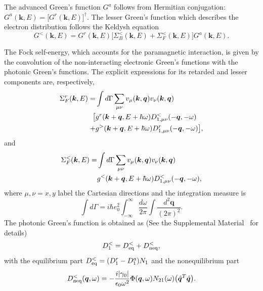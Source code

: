 \documentclass[aps,prl,twocolumn,longbibliography]{revtex4-2}
\begin{document}
The advanced Green's function $G^a$ follows from Hermitian conjugation:
$G^a(\bm{k},E) = \big[G^r(\bm{k},E)\big]^\dag$.
The lesser Green's function which describes the electron distribution follows the Keldysh
equation
\begin{equation} \label{G<}
  G^<(\bm{k},E) = G^r(\bm{k},E) \big[ \Sigma_B^<(\bm{k},E) + \Sigma_F^<(\bm{k},E) \big]
  G^a(\bm{k},E) .
\end{equation}







The Fock self-energy, which accounts for the paramagnetic interaction, is given by the
convolution of the non-interacting electronic Green's functions with the photonic Green's
functions. The explicit expressions for its retarded and lesser components are,
respectively,
\begin{align}
  \Sigma^r_F(\bm{k},E) = & \int d\Gamma \sum_{\mu\nu} v_\mu(\bm{k},\bm{q})
  v_\nu(\bm{k},\bm{q}) \notag \\
  \big[ & g^r(\bm{k}+\bm{q},E+\hbar\omega) D_{1, \mu\nu}^<(-\bm{q},-\omega)  \notag \\
  + & g^>(\bm{k}+\bm{q},E+\hbar\omega) D_{1, \mu\nu}^r(-\bm{q},-\omega) \big]
  \label{Sigma_r} ,
\end{align}
and
\begin{align}
  \Sigma^<_F(\bm{k},E) = & \int d\Gamma \sum_{\mu\nu} v_\mu(\bm{k},\bm{q})
  v_\nu(\bm{k},\bm{q}) \notag \\
  & g^<(\bm{k}+\bm{q},E+\hbar\omega) D_{1, \mu\nu}^<(-\bm{q},-\omega) ,
\end{align}
where $\mu,\nu =x,y$ label the Cartesian directions and the integration measure is
\begin{equation}
  \int d\Gamma = i\hbar e_0^2 \int_{-\infty}^\infty \frac{d\omega}{2\pi} \int
  \frac{d^2\bm{q}}{(2\pi)^2} .
\end{equation}
The photonic Green's function is obtained as (See the Supplemental Material~\cite{SM} for
details)
\begin{equation} \label{D1<_near}
  D_1^< = D_{\rm eq}^< + D_{\rm neq}^< ,
\end{equation}
with the equilibrium part $D_{\rm eq}^< = (D_1^r - D_1^a) N_1$ and the nonequilibrium
part
\begin{equation}
  D_{\rm neq}^<(\bm{q}, \omega) = -\frac{i|\gamma_0|}{\epsilon_0\omega^2} \Phi(\bm{q},
  \omega) N_{21}(\omega) \big( \hat{\bm{q}}^T \hat{\bm{q}} \big) .
\end{equation}
\end{document}
